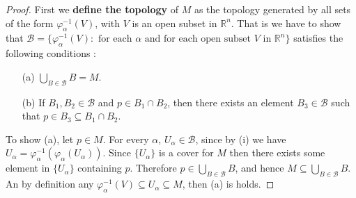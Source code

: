 \documentclass[a4paper]{article}
\theoremstyle{remark}
\newcommand{\rn}{\mathbb{R}^n} %
\newcommand{\subhim}{\subseteq} %
\newcommand{\Ualpha}{U_{\alpha}} %
\begin{document}
\begin{proof}
First we \textbf{define the topology} of $M$ as the topology generated by all sets of the form $\varphi_{\alpha}^{-1}(V)$, with $V$ is an open subset in $\rn$. That is we have to show that $\mathcal{B} = \{\varphi_{\alpha}^{-1}(V) : \text{ for each }\alpha \text{ and for each open subset }V \text{ in }\rn \}$ satisfies the following conditions : 
\begin{enumerate}[nolistsep]
\item[(a)] $\bigcup_{B \in \mathcal{B}} B = M$.
\item[(b)] If $B_1,B_2 \in \mathcal{B}$ and $p \in B_1 \cap B_2$, then there exists an element $B_3 \in \mathcal{B}$ such that $p \in B_3 \subhim B_1 \cap B_2$.   
\end{enumerate}
To show (a), let $p\in M$. For every
$\alpha$, $\Ualpha \in \mathcal{B}$, since by (i) we have $\Ualpha = \varphi_{\alpha}^{-1}(\varphi_{\alpha}(\Ualpha))$. Since $\{U_{\alpha}\}$ is a cover for $M$ then there exists some element in $ \{U_{\alpha}\}$ containing $p$. Therefore $p \in \bigcup_{B \in \mathcal{B}} B$, and hence $M \subhim \bigcup_{B \in \mathcal{B}} B$. An by definition any $\varphi_{\alpha}^{-1}(V) \subhim \Ualpha \subhim M$, then (a) is holds. 


\end{proof}
\end{document}
